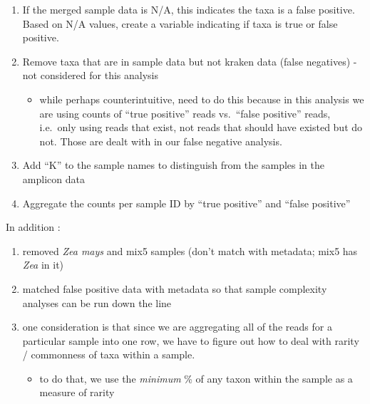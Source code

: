 \documentclass[
]{article}
\providecommand{\tightlist}{%
  \setlength{\itemsep}{0pt}\setlength{\parskip}{0pt}}
\begin{document}
\begin{enumerate}
\def\labelenumi{\arabic{enumi}.}
\tightlist
\item
  If the merged sample data is N/A, this indicates the taxa is a false
  positive. Based on N/A values, create a variable indicating if taxa is
  true or false positive.
\item
  Remove taxa that are in sample data but not kraken data (false
  negatives) - not considered for this analysis

  \begin{itemize}
  \tightlist
  \item
    while perhaps counterintuitive, need to do this because in this
    analysis we are using counts of ``true positive'' reads vs.~``false
    positive'' reads, i.e.~only using reads that exist, not reads that
    should have existed but do not. Those are dealt with in our false
    negative analysis.
  \end{itemize}
\item
  Add ``K'' to the sample names to distinguish from the samples in the
  amplicon data
\item
  Aggregate the counts per sample ID by ``true positive'' and ``false
  positive''
\end{enumerate}

In addition :

\begin{enumerate}
\def\labelenumi{\arabic{enumi}.}
\tightlist
\item
  removed \emph{Zea mays} and mix5 samples (don't match with metadata;
  mix5 has \emph{Zea} in it)
\item
  matched false positive data with metadata so that sample complexity
  analyses can be run down the line
\item
  one consideration is that since we are aggregating all of the reads
  for a particular sample into one row, we have to figure out how to
  deal with rarity / commonness of taxa within a sample.

  \begin{itemize}
  \tightlist
  \item
    to do that, we use the \emph{minimum} \% of any taxon within the
    sample as a measure of rarity
  \end{itemize}
\end{enumerate}
\end{document}
